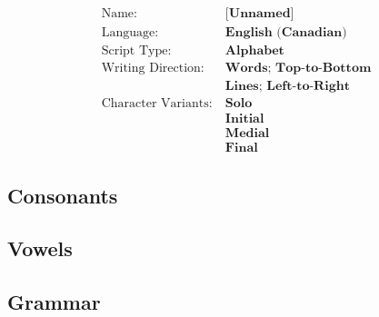 \label{AlD}
\newpage
\begin{align*}
\text{Name:}~               & \textbf{[Unnamed]}                      \\
\text{Language:}~           & \textbf{English (Canadian)}   \\
\text{Script Type:}~        & \textbf{Alphabet}             \\
\text{Writing Direction:}~  & \textbf{Words; Top-to-Bottom} \\
                            & \textbf{Lines; Left-to-Right} \\
\text{Character Variants:}~ & \textbf{Solo}                 \\
                            & \textbf{Initial}              \\
                            & \textbf{Medial}               \\
                            & \textbf{Final}%
\end{align*}

\newpage
\subsection{Consonants}

    
\newpage
\subsection{Vowels}

    
\newpage
\subsection{Grammar}
